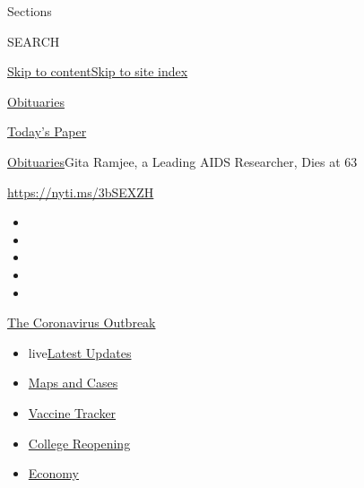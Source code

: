 Sections

SEARCH

\protect\hyperlink{site-content}{Skip to
content}\protect\hyperlink{site-index}{Skip to site index}

\href{https://www.nytimes3xbfgragh.onion/section/obituaries}{Obituaries}

\href{https://myaccount.nytimes3xbfgragh.onion/auth/login?response_type=cookie\&client_id=vi}{}

\href{https://www.nytimes3xbfgragh.onion/section/todayspaper}{Today's
Paper}

\href{/section/obituaries}{Obituaries}\textbar{}Gita Ramjee, a Leading
AIDS Researcher, Dies at 63

\url{https://nyti.ms/3bSEXZH}

\begin{itemize}
\item
\item
\item
\item
\item
\end{itemize}

\href{https://www.nytimes3xbfgragh.onion/news-event/coronavirus?action=click\&pgtype=Article\&state=default\&region=TOP_BANNER\&context=storylines_menu}{The
Coronavirus Outbreak}

\begin{itemize}
\tightlist
\item
  live\href{https://www.nytimes3xbfgragh.onion/2020/08/04/world/coronavirus-covid-19.html?action=click\&pgtype=Article\&state=default\&region=TOP_BANNER\&context=storylines_menu}{Latest
  Updates}
\item
  \href{https://www.nytimes3xbfgragh.onion/interactive/2020/us/coronavirus-us-cases.html?action=click\&pgtype=Article\&state=default\&region=TOP_BANNER\&context=storylines_menu}{Maps
  and Cases}
\item
  \href{https://www.nytimes3xbfgragh.onion/interactive/2020/science/coronavirus-vaccine-tracker.html?action=click\&pgtype=Article\&state=default\&region=TOP_BANNER\&context=storylines_menu}{Vaccine
  Tracker}
\item
  \href{https://www.nytimes3xbfgragh.onion/2020/08/02/us/covid-college-reopening.html?action=click\&pgtype=Article\&state=default\&region=TOP_BANNER\&context=storylines_menu}{College
  Reopening}
\item
  \href{https://www.nytimes3xbfgragh.onion/live/2020/08/03/business/stock-market-today-coronavirus?action=click\&pgtype=Article\&state=default\&region=TOP_BANNER\&context=storylines_menu}{Economy}
\end{itemize}

